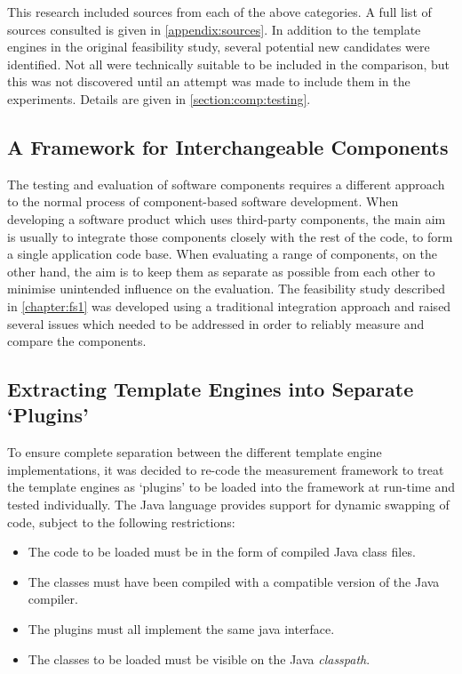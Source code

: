 This research included sources from each of the above categories. A full list of sources consulted is given in \autoref{appendix:sources}. In addition to the template engines in the original feasibility study, several potential new candidates were identified. Not all were technically suitable to be included in the comparison, but this was not discovered until an attempt was made to include them in the experiments. Details are given in \autoref{section:comp:testing}.

\subsection{A Framework for Interchangeable Components}
\label{section:comp:framework}

The testing and evaluation of software components requires a different approach to the normal process of component-based software development. When developing a software product which uses third-party components, the main aim is usually to integrate those components closely with the rest of the code, to form a single application code base. When evaluating a range of components, on the other hand, the aim is to keep them as separate as possible from each other to minimise unintended influence on the evaluation. The feasibility study described in \autoref{chapter:fs1} was developed using a traditional integration approach and raised several issues which needed to be addressed in order to reliably measure and compare the components.

\subsection{Extracting Template Engines into Separate `Plugins'}
\label{section:comp:plugins}

To ensure complete separation between the different template engine implementations, it was decided to re-code the measurement framework to treat the template engines as `plugins' to be loaded into the framework at run-time and tested individually. The Java language provides support for dynamic swapping of code, subject to the following restrictions:

\begin{itemize}
    \item The code to be loaded must be in the form of compiled Java class files.
    \item The classes must have been compiled with a compatible version of the Java compiler.
    \item The plugins must all implement the same java interface.
    \item The classes to be loaded must be visible on the Java \emph{classpath}.
\end{itemize}

